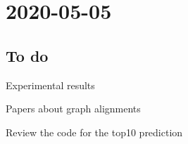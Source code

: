 \chapter{2020-05-05}
\date{ }

%

	
	

\section{To do}

 \begin{todolist}
    \item  Experimental results
     \item  Papers about graph alignments 
    \item[\done]  Review the code for the top10 prediction 
\end{todolist}

